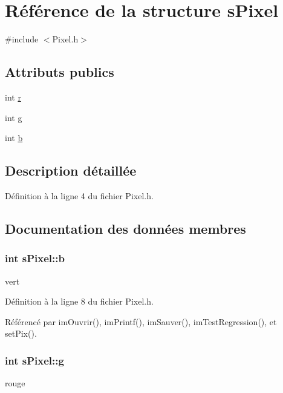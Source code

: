 \hypertarget{structs_pixel}{
\section{Référence de la structure sPixel}
\label{structs_pixel}
}


{\ttfamily \#include $<$Pixel.h$>$}

\subsection*{Attributs publics}
\begin{DoxyCompactItemize}
\item 
int \hyperlink{structs_pixel_ac3c26bdba7b18fa49fef852d541fa03e}{r}
\item 
int \hyperlink{structs_pixel_adeab6b5da8b6de1f00c11f3ca353d517}{g}
\item 
int \hyperlink{structs_pixel_a17afc2137cca0a7d025256c9577907c2}{b}
\end{DoxyCompactItemize}


\subsection{Description détaillée}


Définition à la ligne 4 du fichier Pixel.h.



\subsection{Documentation des données membres}
\hypertarget{structs_pixel_a17afc2137cca0a7d025256c9577907c2}{
\subsubsection[{b}]{\setlength{\rightskip}{0pt plus 5cm}int {\bf sPixel::b}}}
\label{structs_pixel_a17afc2137cca0a7d025256c9577907c2}
vert 

Définition à la ligne 8 du fichier Pixel.h.



Référencé par imOuvrir(), imPrintf(), imSauver(), imTestRegression(), et setPix().

\hypertarget{structs_pixel_adeab6b5da8b6de1f00c11f3ca353d517}{
\subsubsection[{g}]{\setlength{\rightskip}{0pt plus 5cm}int {\bf sPixel::g}}}
\label{structs_pixel_adeab6b5da8b6de1f00c11f3ca353d517}
rouge 

